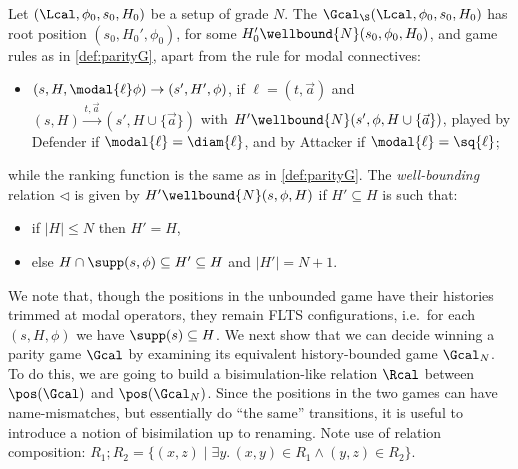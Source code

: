 \begin{definition}
Let $(\Lcal,\phi_0,s_0,H_0)$ be a setup of grade $N$. 
The  $\Gcal_\S(\Lcal,\phi_0, s_0, H_0)$ has root
 position $(s_0, H_0', \phi_0)$, for some $H_0'\wellbound{N}(s_0,\phi_0,H_0)$, and game rules as in \cref{def:parityG}, apart from the rule for modal connectives:
    \begin{itemize}
        \item $(s,H, \modal{\ell}\phi) \rightarrow (s',H', \phi)$, if $\ell=(t, \vec a)$
        and $(s,H) \xrightarrow{t, \vec a} (s',H\cup\{\vec a\})$ with $H'\wellbound{N}(s',\phi,H\cup\{\vec a\})$,
        played by Defender if $\modal{\ell}=\diam{\ell}$, and by Attacker if $\modal{\ell}=\sq{\ell}$;
        \end{itemize}
while the ranking function is the same as in \cref{def:parityG}.
The \emph{well-bounding} relation $\triangleleft$ is given by $H'\wellbound{N}(s,\phi,H)$ if $H'\subseteq H$ is such that:
\begin{itemize}
            \item if $|H| \le N$ then $H' = H$,
            \item else $H \cap \supp(s,\phi) \subseteq H' \subseteq H$ and $|H'| = N + 1$.
        \end{itemize}
\end{definition}

We note that, though the positions in the unbounded game have their histories trimmed at modal operators, they remain FLTS configurations, i.e.\ for each $(s,H,\phi)$ we have $\supp(s)\subseteq H$. 
%
We next show that we can decide winning a parity game $\Gcal$ by examining its equivalent history-bounded game $\Gcal_N$.
To do this, we are going to build a bisimulation-like relation $\Rcal$ between $\pos(\Gcal)$ and $\pos(\Gcal_N)$. Since the positions in the two games can have name-mismatches, but essentially do ``the same'' transitions, it is useful to introduce a notion of {bisimilation} up to renaming. Note use of relation composition: $R_1;R_2=\{(x,z)\mid \exists y.\,(x,y)\in R_1\land (y,z)\in R_2\}$.

